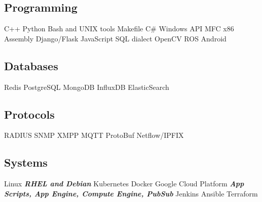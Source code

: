 \documentclass[letterpaper]{deedy-resume} %
\begin{document}
\begin{minipage}[t]{0.33\textwidth}
\sectionspace

\subsection{Programming}
C++ \textbullet{} Python \textbullet{} Bash and UNIX tools  
Makefile \textbullet{} C\# 
\textbullet{} Windows API \textbullet{} MFC  \textbullet{} x86 Assembly 
\textbullet{} Django/Flask \textbullet{} JavaScript \textbullet{} SQL dialect 
\textbullet{} OpenCV \textbullet{} ROS \textbullet{} Android 


\sectionspace

\subsection{Databases}
Redis \textbullet{} PostgreSQL \textbullet{} MongoDB
\textbullet{} InfluxDB \textbullet{} ElasticSearch 

\sectionspace

\subsection{Protocols}
RADIUS \textbullet{} SNMP \textbullet{} XMPP
\textbullet{} MQTT \textbullet{} ProtoBuf \textbullet{} Netflow/IPFIX

\sectionspace

\subsection{Systems}
Linux {\footnotesize \textit{\textbf{RHEL and Debian}}} \textbullet{} Kubernetes 
\textbullet{} Docker \textbullet{} Google Cloud Platform {\footnotesize \textit{\textbf{App Scripts, App Engine, Compute Engine, PubSub}}} 
\textbullet{} Jenkins \textbullet{} Ansible \textbullet{} Terraform 

%

\sectionspace %


\end{minipage} %
\end{document}
